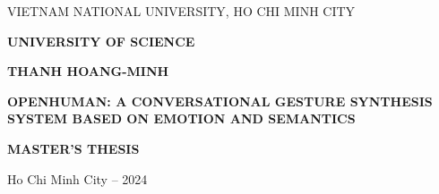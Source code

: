 \begin{titlepage}
	
	\begin{mdframed}[linewidth=1pt,
		linecolor=black,
		leftmargin=0,
		rightmargin=0,
		innertopmargin=20mm,
		innerbottommargin=20mm,
		innerleftmargin=10mm,
		innerrightmargin=10mm,
		skipabove=0,
		skipbelow=0]
		
		
		\centering
		\vspace*{1cm}
		
		{VIETNAM NATIONAL UNIVERSITY, HO CHI MINH CITY\par}
		\vspace{0.25cm}
		{\large \textbf{UNIVERSITY OF SCIENCE}\par}
		
		\vspace{2cm}
		
		{\large \MakeUppercase{\textbf{THANH HOANG-MINH}}\par}
		
		\vspace{2cm}
		
		{\Large \bfseries
			\MakeUppercase{OpenHuman: A Conversational Gesture Synthesis System Based on Emotion and Semantics} \par}
		
		\vspace{3cm}
		
		{\large \bfseries
			MASTER'S THESIS\par}
		
		\vfill
		\vspace{3cm}
		
		{\small Ho Chi Minh City – 2024 \par}
	\end{mdframed}
\end{titlepage}

\pagebreak



